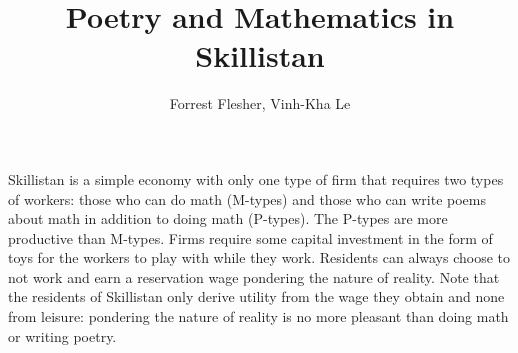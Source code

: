 \documentclass[12pt]{article}
\title{Poetry and Mathematics in Skillistan}
\author{Forrest Flesher, Vinh-Kha Le}
\begin{document}
\maketitle



Skillistan is a simple economy with only one type of firm that requires two types of workers:
those who can do math (M-types) and those who can write poems about math in addition
to doing math (P-types). The P-types are more productive than M-types. Firms
require some capital investment in the form of toys for the workers to play with while they
work. Residents can always choose to not work and earn a reservation wage pondering the
nature of reality. Note that the residents of Skillistan only derive utility from the wage
they obtain and none from leisure: pondering the nature of reality is no more pleasant
than doing math or writing poetry.
\end{document}
